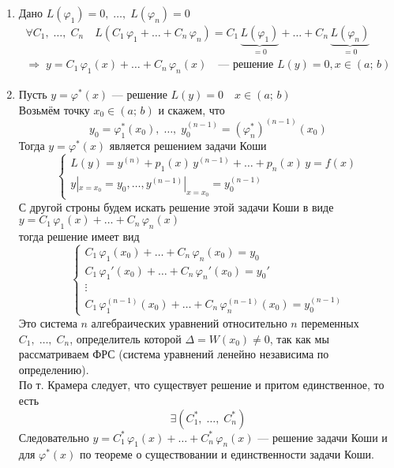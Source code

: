 \begin{Proof}
    \begin{enumerate}
        \item Дано $L(\varphi_1) = 0,\; \dots,\; L(\varphi_n) = 0$
        \begin{gather*}
            \forall C_1,\; \dots,\; C_n \quad L(C_1\,\varphi_1 + \dots + C_n\,\varphi_n) = C_1\,\underbrace{L(\varphi_1)}_{ = 0} + \dots + C_n\,\underbrace{L(\varphi_n)}_{ = 0}\\
            \Rightarrow \; y = C_1\,\varphi_1(x) + \dots + C_n\,\varphi_n(x) \quad \text{--- решение } L(y) = 0, x \in (a;\, b)
        \end{gather*}
            
        \item Пусть $y = \varphi^*(x)$ --- решение $L(y) = 0 \quad x \in (a;\,b)$\\
        Возьмём точку $x_0 \in (a;\,b)$ и скажем, что
        \[
            y_0 = \varphi_1^*(x_0),\; \dots,\; y_0^{(n-1)} = (\varphi_n^*)^{(n-1)}(x_0)
        \]
        Тогда $y = \varphi^*(x)$ является решением задачи Коши
        \[
            \begin{cases}
                L(y) = y^{(n)}+p_1(x)\,y^{(n-1)}+\dots+p_n(x)\,y=f(x)\\
                y|_{x=x_0}=y_0, \dots , y^{(n-1)}|_{x=x_0}=y_0^{(n-1)}
            \end{cases}
        \]
        С другой строны будем искать решение этой задачи Коши в виде $y = C_1\,\varphi_1(x) + \dots + C_n\,\varphi_n(x)$\\
        тогда решение имеет вид
        \[
            \begin{cases}
                C_1\,\varphi_1(x_0) + \dots + C_n\,\varphi_n(x_0) = y_0\\
                C_1\,\varphi_1'(x_0) + \dots + C_n\,\varphi_n'(x_0) = y_0'\\
                \vdots\\
                C_1\,\varphi_1^{(n-1)}(x_0) + \dots + C_n\,\varphi_n^{(n-1)}(x_0) = y_0^{(n-1)}
            \end{cases}
        \]
        Это система $n$ алгебраических уравнений относительно $n$ переменных $C_1,\; \dots,\; C_n$, определитель которой $\Delta = W(x_0) \neq 0$, так как мы рассматриваем ФРС (система уравнений ленейно независима по определению).\\
        
        По т. Крамера следует, что существует решение и притом единственное, то есть
        \[
            \exists (C_1^*,\; \dots,\; C_n^*)
        \]
        Следовательно $y = C_1^*\,\varphi_1(x) + \dots + C_n^*\,\varphi_n(x)$ --- решение задачи Коши и для $\varphi^*(x)$ по теореме о существовании и единственности задачи Коши.
    \end{enumerate}
\end{Proof}

